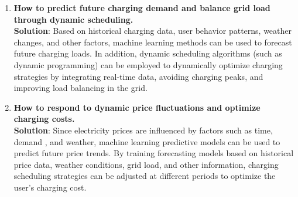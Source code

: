 \documentclass[
english,
ruledheaders=section,%
class=report,%
thesis={type=Report},%
accentcolor=9c,%
custommargins=true,%
marginpar=false,%
parskip=half-,%
fontsize=11pt,%
logofile={img/tuda_logo.pdf}, %
]{tudapub}
\begin{document}
    \begin{enumerate}

        \item \textbf{How to predict future charging demand and balance grid load through dynamic scheduling.} \\
        \textbf{Solution}: Based on historical charging data, user behavior patterns, weather changes, and other factors, machine learning methods can be used to forecast future charging loads. In addition, dynamic scheduling algorithms (such as dynamic programming) can be employed to dynamically optimize charging strategies by integrating real-time data, avoiding charging peaks, and improving load balancing in the grid.



        \item \textbf{How to respond to dynamic price fluctuations and optimize charging costs.} \\
        \textbf{Solution}: Since electricity prices are influenced by factors such as time, demand , and weather, machine learning predictive models can be used to predict future price trends. By training forecasting models based on historical price data, weather conditions, grid load, and other information, charging scheduling strategies can be adjusted at different periods to optimize the user's charging cost.




\end{enumerate}
\end{document}
